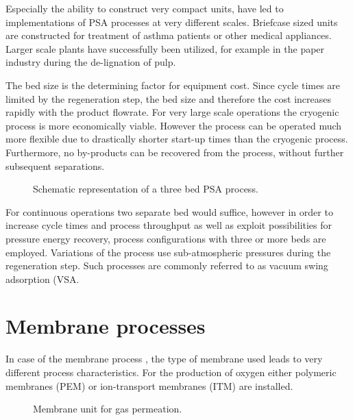     Especially the ability to construct very compact units, have led to implementations of PSA processes at 
    very different scales. Briefcase sized units are constructed for treatment of asthma patients or other 
    medical appliances. Larger scale plants have successfully been utilized, for example in the paper industry 
    during the de-lignation of pulp\cite{Nelson.1993}.

    The bed size is the determining factor for equipment cost. Since cycle times are limited by the regeneration
    step, the bed size and therefore the cost increases rapidly with the product flowrate. For very large
    scale operations the cryogenic process is more economically viable. However the process can be operated
    much more flexible due to drastically shorter start-up times than the cryogenic process. Furthermore, no
    by-products can be recovered from the process, without further subsequent separations\cite{Choi.2003}.

    \begin{figure}
    	\center
    	
    	\caption{Schematic representation of a three bed PSA process.}
    	\label{fig:PSA}
    \end{figure}
    
    For continuous operations two separate bed would suffice, however in order to increase cycle times and process 
    throughput as well as exploit possibilities for pressure energy recovery, process configurations with three or more 
    beds are employed. Variations of the process use sub-atmospheric pressures during the regeneration step. Such processes
    are commonly referred to as vacuum swing adsorption (VSA.  

    \section{Membrane processes}
    \label{sec:membrane}
    In case of the membrane process , the type of membrane used leads to very different process characteristics. For the
    production of oxygen either polymeric membranes (PEM) or ion-transport membranes (ITM) are installed. 
    
     \begin{figure}
    	\center
    	
	    \caption{Membrane unit for gas permeation.}
    	\label{fig:gas_permeation}
    \end{figure}
    
